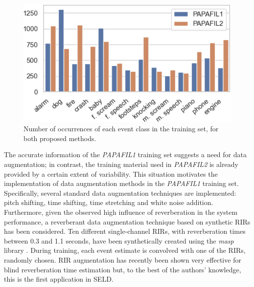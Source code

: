 \begin{figure}[t]
  \centering
  \centerline{\includegraphics[width=\columnwidth]{Figures/SELD/numclasses2_tight.png}}
  \caption{Number of occurrences of each event class in the training set, for both proposed methods. }
  \label{fig:num_events}
\end{figure}


The accurate information of the \textit{PAPAFIL1} training set suggests a need for data augmentation; 
in contrast, the training material used in \textit{PAPAFIL2} is already provided by a certain extent of variability.
This situation motivates the implementation of data augmentation methods in the \textit{PAPAFIL1} training set.
Specifically, several standard data augmentation techniques are implemented: pitch shifting, time shifting, time stretching and white noise addition.
Furthermore, given the observed high influence of reverberation in the system performance, a reverberant data augmentation technique based on synthetic RIRs has been considered. 
Ten different single-channel RIRs, with reverberation times between 0.3 and 1.1 seconds, have been synthetically created using the \textit{masp} library \cite{perez2020python}. During training, each event estimate is convolved with one of the RIRs, randomly chosen. 
RIR augmentation has recently been shown very effective for blind reverberation time estimation \cite{bryan2020impulse} but, to the best of the authors' knowledge, this is the first application in SELD.



